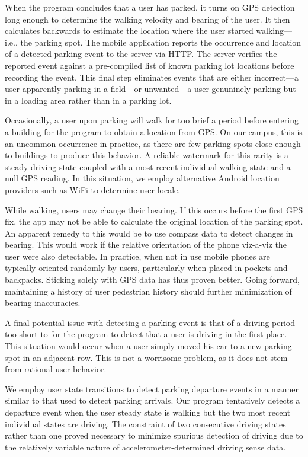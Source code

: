 When the program concludes that a user has parked, it turns on GPS detection
long enough to determine the walking velocity and bearing of the user. It
then calculates backwards to estimate the location where the user started
walking---i.e., the parking spot. The mobile application reports the
occurrence and location of a detected parking event to the server via HTTP.
The server verifies the reported event against a pre-compiled list of known
parking lot locations before recording the event. This final step eliminates
events that are either incorrect---a user apparently parking in a field---or
unwanted---a user genuninely parking but in a loading area rather than in a
parking lot.

Occasionally, a user upon parking will walk for too brief a period before
entering a building for the program to obtain a location from GPS. On our
campus, this is an uncommon occurrence in practice, as there are few parking
spots close enough to buildings to produce this behavior. A reliable watermark
for this rarity is a steady driving state coupled with a most recent
individual walking state and a null GPS reading. In this situation, we employ
alternative Android location providers such as WiFi to determine user locale.

While walking, users may change their bearing. If this occurs before the
first GPS fix, the app may not be able to calculate the original location of
the parking spot. An apparent remedy to this would be to use compass data to
detect changes in bearing. This would work if the relative orientation of the
phone viz-a-viz the user were also detectable. In practice, when not in use
mobile phones are typically oriented randomly by users, particularly when
placed in pockets and backpacks. Sticking solely with GPS data has thus
proven better. Going forward, maintaining a history of user pedestrian
history should further minimization of bearing inaccuracies.

A final potential issue with detecting a parking event is that of a driving
period too short to for the program to detect that a user is driving in the
first place. This situation would occur when a user simply moved his car to a
new parking spot in an adjacent row. This is not a worrisome problem, as it
does not stem from rational user behavior.

We employ user state transitions to detect parking departure events in a
manner similar to that used to detect parking arrivals. Our program
tentatively detects a departure event when the user steady state is walking
but the two most recent individual states are driving. The constraint of two
consecutive driving states rather than one proved necessary to minimize
spurious detection of driving due to the relatively variable nature of
accelerometer-determined driving sense data.

